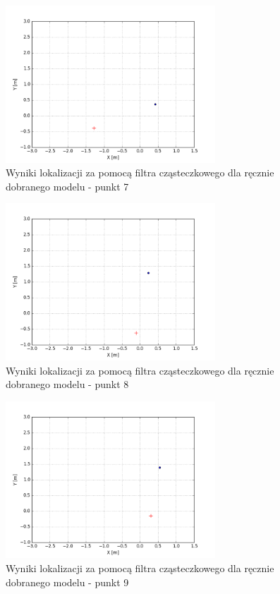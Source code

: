 \begin{figure}[H]
\centering
\includegraphics[width=0.7\textwidth]{img/pf-map3-7.png}
\caption{Wyniki lokalizacji za pomocą filtra cząsteczkowego dla ręcznie dobranego modelu - punkt 7}
\end{figure}
\begin{figure}[H]
\centering
\includegraphics[width=0.7\textwidth]{img/pf-map3-8.png}
\caption{Wyniki lokalizacji za pomocą filtra cząsteczkowego dla ręcznie dobranego modelu - punkt 8}
\end{figure}
\begin{figure}[H]
\centering
\includegraphics[width=0.7\textwidth]{img/pf-map3-9.png}
\caption{Wyniki lokalizacji za pomocą filtra cząsteczkowego dla ręcznie dobranego modelu - punkt 9}
\end{figure}
